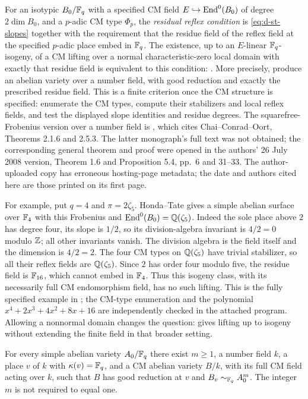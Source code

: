 For an isotypic $B_0/\mathbb F_q$ with a specified CM field
$E\hookrightarrow\operatorname{End}^0(B_0)$ of degree $2\dim B_0$, and a
$p$-adic CM type $\Phi_p$, the \emph{residual reflex condition} is
\eqref{eq:d-st-slopes} together with the requirement that the residue
field of the reflex field at the specified $p$-adic place embed in
$\mathbb F_q$.  The existence, up to an $E$-linear $\mathbb F_q$-isogeny, of a CM
lifting over a normal characteristic-zero local domain with exactly
that residue field is equivalent to this condition:
\citet[Theorem (4.4)]{DOort2009}.  More precisely,
\citet[Theorem 1.6 and Proposition 5.4]{DCCO2008} produce an
abelian variety over a number field, with good reduction and exactly
the prescribed residue field.  This is a finite criterion once the
CM structure is specified: enumerate the CM types, compute their
stabilizers and local reflex fields, and test the displayed slope
identities and residue degrees.  The squarefree-Frobenius version over
a number field is \citet[Definition 2.14 and Theorem 2.16]{DBergstromEtAl2023},
which cites Chai--Conrad--Oort, Theorems 2.1.6 and 2.5.3.  The latter
monograph's full text was not obtained; the corresponding general
theorem and proof were opened in the authors' 26 July 2008 version,
Theorem 1.6 and Proposition 5.4, pp.~6 and 31--33.  The author-uploaded
copy has erroneous hosting-page metadata; the date and authors cited
here are those printed on its first page.

For example, put $q=4$ and $\pi=2\zeta_5$.  Honda--Tate gives a simple
abelian surface over $\mathbb F_4$ with this Frobenius and
$\operatorname{End}^0(B_0)=\mathbb Q(\zeta_5)$.  Indeed the sole place above $2$ has
degree four, its slope is $1/2$, so its division-algebra invariant is
$4/2=0$ modulo $\mathbb Z$; all other invariants vanish.  The division algebra
is the field itself and the dimension is $4/2=2$.  The four CM types
on $\mathbb Q(\zeta_5)$ have trivial stabilizer, so all their reflex fields
are $\mathbb Q(\zeta_5)$.  Since $2$ has order four modulo five, the residue
field is $\mathbb F_{16}$, which cannot embed in $\mathbb F_4$.  Thus this isogeny
class, with its necessarily full CM endomorphism field, has no such
lifting.  This is the fully specified example in
\citet[Example (3.3)]{DOort2009}; the CM-type enumeration and the
polynomial $x^4+2x^3+4x^2+8x+16$ are independently checked in the
attached program.  Allowing a nonnormal domain changes the question:
\citet[Theorem (5.2)]{DOort2009} gives lifting up to isogeny without
extending the finite field in that broader setting.

\begin{lemma}
\label{lem:d-power-cm-lift}
For every simple abelian variety $A_0/\mathbb F_q$ there exist $m\geq1$,
a number field $k$, a place $v$ of $k$ with $\kappa(v)=\mathbb F_q$, and a
CM abelian variety $B/k$, with its full CM field acting over $k$,
such that $B$ has good reduction at $v$ and
$B_v\sim_{\mathbb F_q}A_0^m$.  The integer $m$ is not required to equal one.
\end{lemma}

